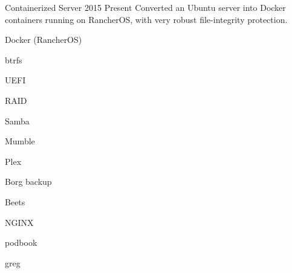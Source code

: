 

\begin{cventries}

  \cventry%
    {} %
    {Containerized Server} %
    {} %
    {2015 \- Present} %
    {Converted an Ubuntu server into Docker containers running on RancherOS, with very robust file-integrity protection.}
    \begin{cventryskills}
      \item Docker (RancherOS)
      \item btrfs
      \item UEFI
      \item RAID
      \item Samba
      \item Mumble
      \item Plex
      \item Borg backup
      \item Beets
      \item NGINX
      \item podbook
      \item greg
    \end{cventryskills}

\end{cventries}
